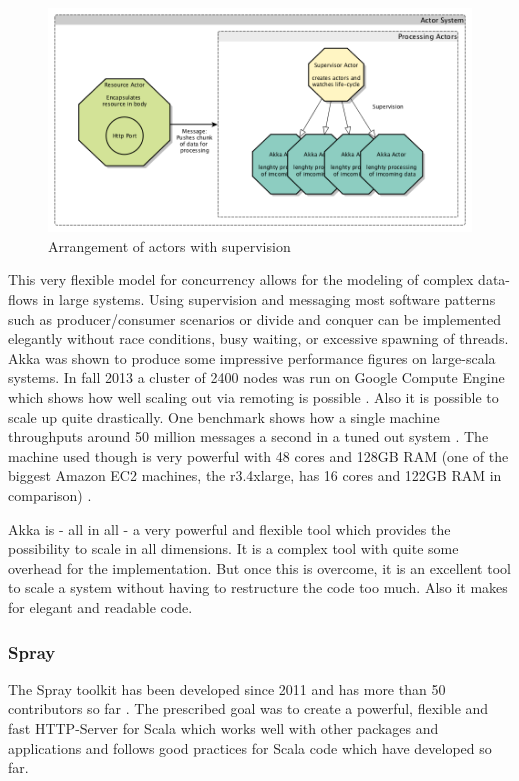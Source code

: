 \documentclass[twoside, 11pt]{scrartcl}
\begin{document}
\begin{figure}[h]		
 	\includegraphics[scale=0.4]{figures/akkaExample2.png}
	\caption{Arrangement of actors with supervision}
	\label{fig:akkaExample2}
\end{figure}

This very flexible model for concurrency allows for the modeling of complex data-flows in large systems. Using supervision and messaging most software patterns such as producer/consumer scenarios or divide and conquer can be implemented elegantly without race conditions, busy waiting, or excessive spawning of threads. Akka was shown to produce some impressive performance figures on large-scala systems. In fall 2013 a cluster of 2400 nodes was run on Google Compute Engine which shows how well scaling out via remoting is possible \cite{link:akkaCluster}. Also it is possible to scale up quite drastically. One benchmark shows how a single machine throughputs around 50 million messages a second in a tuned out system \cite{link:akkaScaleUp}. The machine used though is very powerful with 48 cores and 128GB RAM (one of the biggest Amazon EC2 machines, the r3.4xlarge, has 16 cores and 122GB RAM in comparison) \cite{link:ec2Pricing}.


Akka is - all in all - a very powerful and flexible tool which provides the possibility to scale in all dimensions. It is a complex tool with quite some overhead for the implementation. But once this is overcome, it is an excellent tool to scale a system without having to restructure the code too much. Also it makes for elegant and readable code.


\subsubsection{Spray}
The Spray toolkit has been developed since 2011 \cite{link:sprayChangelog} and has more than 50 contributors so far \cite{link:sprayGithub}. The prescribed goal was to create a powerful, flexible and fast HTTP-Server for Scala which works well with other packages and applications and follows good practices for Scala code which have developed so far.\\
\end{document}
